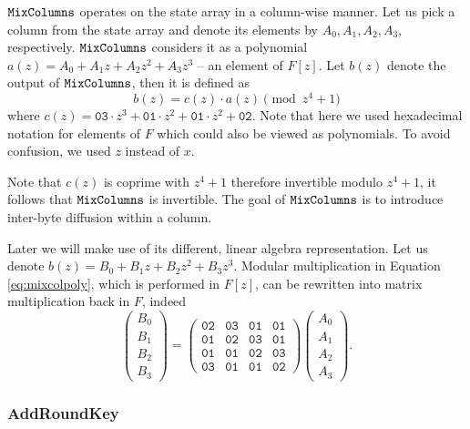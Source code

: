 	$\texttt{MixColumns}$ operates on the state array in a column-wise manner. Let us pick a column from the state array and denote its elements by $A_0, A_1, A_2, A_3$, respectively. $\texttt{MixColumns}$ considers it as a polynomial $a(z) = A_0 + A_1 z + A_2 z^2 + A_3 z^3$ -- an element of $F[z]$. Let $b(z)$ denote the output of $\texttt{MixColumns}$, then it is defined as
	\begin{equation}
	\label{eq:mixcolpoly}
		b(z) = c(z) \cdot a(z) \pmod{z^4+1}
	\end{equation}
	where $c(z) = \texttt{03}\cdot z^3 + \texttt{01}\cdot z^2 + \texttt{01}\cdot z^2 + \texttt{02}$. Note that here we used hexadecimal notation for elements of $F$ which could also be viewed as polynomials. To avoid confusion, we used $z$ instead of $x$.
	
	Note that $c(z)$ is coprime with $z^4+1$ therefore invertible modulo $z^4+1$, it follows that $\texttt{MixColumns}$ is invertible. The goal of $\texttt{MixColumns}$ is to introduce inter-byte diffusion within a column.
	
	Later we will make use of its different, linear algebra representation. Let us denote $b(z) = B_0 + B_1 z + B_2 z^2 + B_3 z^3$. Modular multiplication in Equation \ref{eq:mixcolpoly}, which is performed in $F[z]$, can be rewritten into matrix multiplication back in $F$, indeed
	\begin{equation}
	\label{eq:mixcolmatr}
		\begin{pmatrix}
			B_0 \\ B_1 \\ B_2 \\ B_3
		\end{pmatrix}
		=
		\begin{pmatrix}
			\texttt{02} & \texttt{03} & \texttt{01} & \texttt{01} \\
			\texttt{01} & \texttt{02} & \texttt{03} & \texttt{01} \\
			\texttt{01} & \texttt{01} & \texttt{02} & \texttt{03} \\
			\texttt{03} & \texttt{01} & \texttt{01} & \texttt{02}
		\end{pmatrix}
		\begin{pmatrix}
			A_0 \\ A_1 \\ A_2 \\ A_3
		\end{pmatrix}.
	\end{equation}

\subsubsection{AddRoundKey}
	
